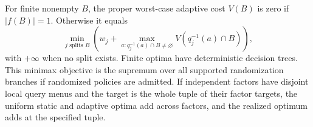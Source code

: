 \begin{theorem}\label{thm:t08}

For finite nonempty \(B\), the proper worst-case adaptive cost \(V(B)\) is zero if \(|f(B)|=1\). Otherwise it equals
\[
\min_{j\text{ splits }B}\left(w_j+\max_{a:q_j^{-1}(a)\cap B\ne\varnothing}V(q_j^{-1}(a)\cap B)\right),
\]
with \(+\infty\) when no split exists. Finite optima have deterministic decision trees. This minimax objective is the supremum over all supported randomization branches if randomized policies are admitted. If independent factors have disjoint local query menus and the target is the whole tuple of their factor targets, the uniform static and adaptive optima add across factors, and the realized optimum adds at the specified tuple.

\end{theorem}

